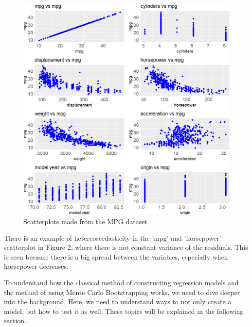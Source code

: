 \begin{figure}[h]
	\includegraphics[width=\linewidth]{billder/2.png}
	\caption{Scatterplots made from the MPG dataset}
	\label{fig:2}
\end{figure}
\noindent There is an example of hetereoscedasticity in the 'mpg' and 'horsepower' scatterplot in Figure 2, where there is not constant variance of the residuals. This is seen because there is a big spread between the variables, especially when horsepower decreases.   

\noindent To understand how the classical method of constructing regression models and the method of using Monte Carlo Bootstrapping works, we need to dive deeper into the background. Here, we need to understand ways to not only create a model, but how to test it as well. These topics will be explained in the following section.

